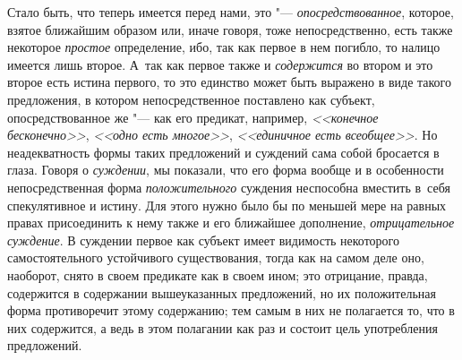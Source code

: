 Стало быть, что теперь имеется перед нами, это "--- {\em опосредствованное},
которое, взятое ближайшим образом или, иначе говоря, тоже
непосредственно, есть также некоторое {\em простое}
определение, ибо, так как первое в нем погибло, то налицо
имеется лишь второе. А~так как первое также и {\em содержится} во
втором и это второе есть истина первого, то это единство может быть
выражено в виде такого предложения, в котором
непосредственное поставлено как субъект, опосредствованное же
"--- как его предикат, например, {\em <<конечное бесконечно>>},
{\em <<одно есть многое>>}, {\em <<единичное есть всеобщее>>}.
Но неадекватность формы таких предложений и суждений сама
собой бросается в глаза. Говоря о {\em суждении}, мы
показали, что его форма вообще и в особенности непосредственная форма
{\em положительного}
суждения неспособна вместить в~себя спекулятивное и истину.
Для этого нужно было бы по меньшей мере на равных правах присоединить к
нему также и его ближайшее дополнение,
{\em отрицательное суждение}.
В суждении первое как субъект имеет видимость некоторого
самостоятельного устойчивого существования, тогда как на самом деле оно,
наоборот, снято в своем предикате как в своем ином; это отрицание,
правда, содержится в содержании вышеуказанных предложений, но их
положительная форма противоречит этому содержанию; тем самым в них не
полагается то, что в них содержится, а ведь в этом полагании как раз и
состоит цель употребления предложений.

